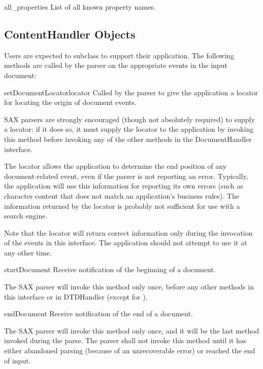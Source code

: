 \begin{datadesc}{all_properties}
  List of all known property names.
\end{datadesc}


\subsection{ContentHandler Objects \label{content-handler-objects}}

Users are expected to subclass  to support their
application.  The following methods are called by the parser on the
appropriate events in the input document:

\begin{methoddesc}[ContentHandler]{setDocumentLocator}{locator}
  Called by the parser to give the application a locator for locating
  the origin of document events.
  
  SAX parsers are strongly encouraged (though not absolutely required)
  to supply a locator: if it does so, it must supply the locator to
  the application by invoking this method before invoking any of the
  other methods in the DocumentHandler interface.
  
  The locator allows the application to determine the end position of
  any document-related event, even if the parser is not reporting an
  error. Typically, the application will use this information for
  reporting its own errors (such as character content that does not
  match an application's business rules). The information returned by
  the locator is probably not sufficient for use with a search engine.
  
  Note that the locator will return correct information only during
  the invocation of the events in this interface. The application
  should not attempt to use it at any other time.
\end{methoddesc}

\begin{methoddesc}[ContentHandler]{startDocument}{}
  Receive notification of the beginning of a document.
        
  The SAX parser will invoke this method only once, before any other
  methods in this interface or in DTDHandler (except for
  ).
\end{methoddesc}

\begin{methoddesc}[ContentHandler]{endDocument}{}
  Receive notification of the end of a document.
        
  The SAX parser will invoke this method only once, and it will be the
  last method invoked during the parse. The parser shall not invoke
  this method until it has either abandoned parsing (because of an
  unrecoverable error) or reached the end of input.
\end{methoddesc}

